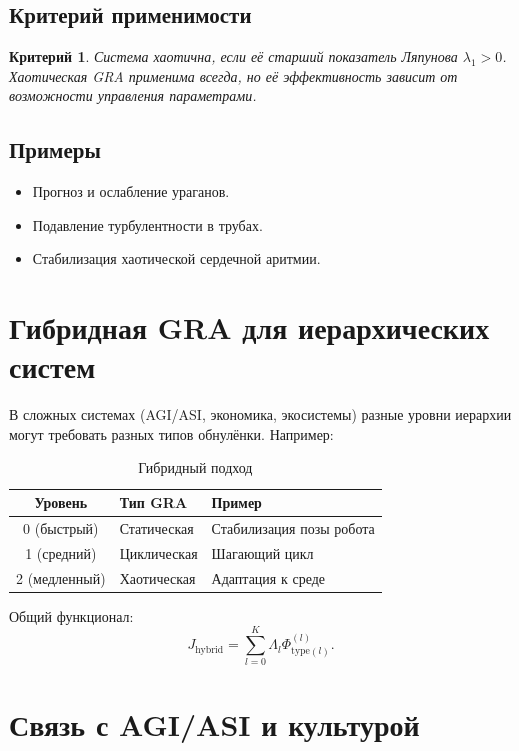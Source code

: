 \documentclass[12pt,a4paper]{article}
\newtheorem{criteria}{Критерий}
\begin{document}
\subsection{Критерий применимости}

\begin{criteria}
Система хаотична, если её старший показатель Ляпунова \(\lambda_1 > 0\). Хаотическая GRA применима всегда, но её эффективность зависит от возможности управления параметрами.
\end{criteria}

\subsection{Примеры}
\begin{itemize}
    \item Прогноз и ослабление ураганов.
    \item Подавление турбулентности в трубах.
    \item Стабилизация хаотической сердечной аритмии.
\end{itemize}

\section{Гибридная GRA для иерархических систем}

В сложных системах (AGI/ASI, экономика, экосистемы) разные уровни иерархии могут требовать разных типов обнулёнки. Например:

\begin{table}[h]
\centering
\caption{Гибридный подход}
\begin{tabular}{|c|l|l|}
\hline
Уровень & Тип GRA & Пример \\
\hline
0 (быстрый) & Статическая & Стабилизация позы робота \\
1 (средний) & Циклическая & Шагающий цикл \\
2 (медленный) & Хаотическая & Адаптация к среде \\
\hline
\end{tabular}
\end{table}

Общий функционал:
\[
J_{\text{hybrid}} = \sum_{l=0}^{K} \Lambda_l \Phi_{\text{type}(l)}^{(l)}.
\]

\section{Связь с AGI/ASI и культурой}
\end{document}
